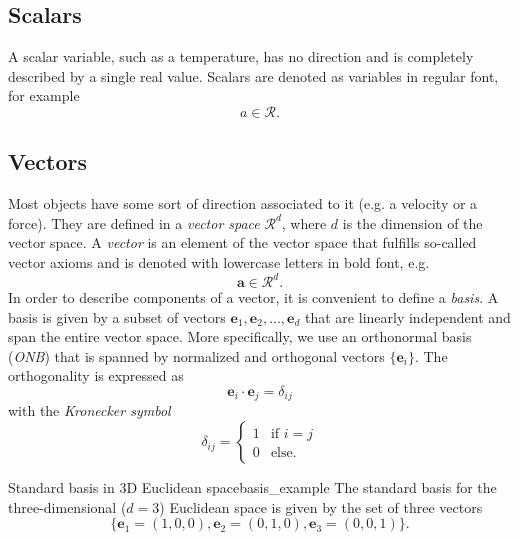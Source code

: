 \subsection{Scalars}
A scalar variable, such as a temperature, has no direction and is completely described by a single real value. Scalars are denoted as variables in regular font, for example
\begin{equation}
    a \in \mathcal{R}.
\end{equation}

\subsection{Vectors}
Most objects have some sort of direction associated to it (e.g. a velocity or a force). They are defined in a \emph{vector space} 
$\mathcal{R}^d$, where $d$ is the dimension of the vector space. A \emph{vector} is an element of the vector space that fulfills so-called vector axioms and is denoted with lowercase letters in bold font, e.g. 
\begin{equation}
    \textbf{a} \in \mathcal{R}^d.
\end{equation}
In order to describe components of a vector, it is convenient to define a \emph{basis}. A basis is given by a subset of vectors ${\mathbf{e}_1,\mathbf{e}_2,...,\mathbf{e}_d}$ that are linearly independent and span the entire vector space.
More specifically, we use an orthonormal basis (\emph{ONB}) that is spanned by normalized and orthogonal vectors $\{\mathbf{e}_i\}$. The orthogonality is expressed as  
\begin{equation}
    \label{eq:orthogonality}
    \mathbf{e}_i \cdot \mathbf{e}_j = \delta_{ij}
\end{equation}
with the \emph{Kronecker symbol} 
\begin{equation}
    \delta_{ij} = 
    \begin{cases}
    1 & \text{if }  i=j \\
    0 & \text{else}.
    \end{cases}
\end{equation}

\begin{example}{Standard basis in 3D Euclidean space}{basis_example}
    The standard basis for the three-dimensional ($d=3$) Euclidean space is given by the set of three vectors
    \begin{equation}
        \{\mathbf{e}_1=(1,0,0), \mathbf{e}_2=(0,1,0), \mathbf{e}_3=(0,0,1)\}.
    \end{equation}
\end{example}

